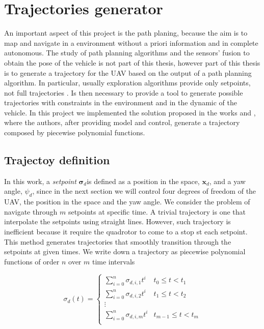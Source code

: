 \chapter{Trajectories generator}
\label{trajectoriesGenerator}

An important aspect of this project is the path planing, because the aim is to map and navigate in a environment without a priori information and in complete autonomous. The study of path planning algorithms and the sensors' fusion to obtain the pose of the vehicle is not part of this thesis, however part of this thesis is to generate a trajectory for the UAV based on the output of a path planning algorithm. In particular, usually exploration algorithms provide only setpoints, not full trajectories \cite{potentialField} \cite{visionBasedMAV}. Is then necessary to provide a tool to generate possible trajectories with constraints in the environment and in the dynamic of the vehicle. In this project we implemented the solution proposed in the works \cite{minimumSnap} and \cite{polyTraj}, where the authors, after providing model and control, generate a trajectory composed by piecewise polynomial functions.


\section{Trajectoy definition}
\label{trajDefinition}

In this work, a \textit{setpoint} $\boldsymbol{\sigma}_d$is defined as a position in the space, $\mathbf{x}_d$, and a yaw angle, $\psi_d$, since in the next section we will control four degrees of freedom of the UAV, the position in the space and the yaw angle. We consider the problem of navigate through $m$ setpoints at specific time. A trivial trajectory is one that interpolate the setpoints using straight lines. However, such trajectory is inefficient because it require the quadrotor to come to a stop st each setpoint. This method generates trajectories that smoothly transition through the setpoints at given times. We write down a trajectory as piecewise polynomial functions of order $n$ over $m$ time intervals

\begin{equation}
	\sigma_d(t)=
	\begin{cases}
		\sum\limits_{i=0}^{n}\sigma_{d,i,1}t^i & t_0 \le t < t_1 \\
		\sum\limits_{i=0}^{n}\sigma_{d,i,2}t^i & t_1 \le t < t_2 \\
		\vdots \\
		\sum\limits_{i=0}^{n}\sigma_{d,i,m}t^i & t_{m-1} \le t < t_m \\
	\end{cases}
	\label{eq:defTraj}
\end{equation}

